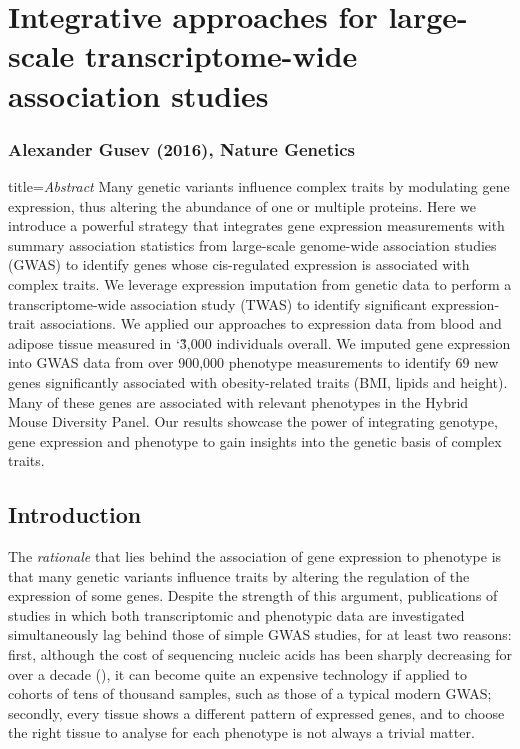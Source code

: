 \documentclass[../main.tex]{subfiles}
\begin{document}
\chapter{Integrative approaches for large-scale transcriptome-wide 
association studies}

\subsection{Alexander Gusev \etal (2016), Nature Genetics}

\begin{external_abstract}{title=\textit{Abstract}}
Many genetic variants influence complex traits by modulating gene 
expression, thus altering the abundance of one or multiple proteins. 
Here we introduce a powerful strategy that integrates gene expression 
measurements with summary association statistics from large-scale 
genome-wide association studies (GWAS) to identify genes whose 
cis-regulated expression is associated with complex traits. We leverage 
expression imputation from genetic data to perform a transcriptome-wide 
association study (TWAS) to identify significant expression-trait 
associations. We applied our approaches to expression data from blood 
and adipose tissue measured in \char`\~3,000 individuals overall. We 
imputed gene expression into GWAS data from over 900,000 phenotype 
measurements to identify 69 new genes significantly associated with 
obesity-related traits (BMI, lipids and height). Many of these genes are 
associated with relevant phenotypes in the Hybrid Mouse Diversity Panel. 
Our results showcase the power of integrating genotype, gene expression 
and phenotype to gain insights into the genetic basis of complex traits.
\end{external_abstract}

\section{Introduction}

The \textit{rationale} that lies behind the association of gene 
expression to phenotype is that many genetic variants influence traits 
by altering the regulation of the expression of some genes. Despite the 
strength of this argument, publications of studies in which both 
transcriptomic and phenotypic data are investigated simultaneously lag 
behind those of simple GWAS studies, for at least two reasons: first, 
although the cost of sequencing nucleic acids has been sharply 
decreasing for over a decade (), it can become 
quite an expensive technology if applied to cohorts of tens of thousand 
samples, such as those of a typical modern GWAS; secondly, every tissue 
shows a different pattern of expressed genes, and to choose the right 
tissue to analyse for each phenotype is not always a trivial 
matter.
\end{document}
